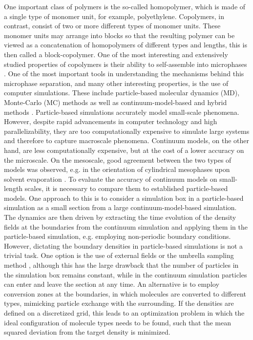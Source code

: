 \documentclass[bachelor,       %
               twoside,        %
               BCOR10mm,       %
                ngerman,english  %
               ]{GAUBM}
\begin{document}
One important class of polymers is the so-called homopolymer, which is made of a single type of monomer unit, for example, polyethylene. Copolymers, in contrast, consist of two or more different types of monomer units. These monomer units may arrange into blocks so that the resulting polymer can be viewed as a concatenation of homopolymers of different types and lengths, this is then called a block-copolymer. One of the most interesting and extensively studied properties of copolymers is their ability to self-assemble into microphases \cite{leibler1980theory}. One of the most important tools in understanding the mechanisms behind this microphase separation, and many other interesting properties, is the use of computer simulations. These include particle-based molecular dynamics (MD), Monte-Carlo (MC) methods as well as continuum-model-based and hybrid methods \cite{Shuanhu2017}. Particle-based simulations accurately model small-scale phenomena. However, despite rapid advancements in computer technology and high parallelizability, they are too computationally expensive to simulate large systems and therefore to capture macroscale phenomena. Continuum models, on the other hand, are less computationally expensive, but at the cost of a lower accuracy on the microscale. On the mesoscale, good agreement between the two types of models was observed, e.g. in the orientation of cylindrical mesophases upon solvent evaporation \cite{Dreyer22}. To evaluate the accuracy of continuum models on small-length scales, it is necessary to compare them to established particle-based models. One approach to this is to consider a simulation box in a particle-based simulation as a small section from a large continuum-model-based simulation. The dynamics are then driven by extracting the time evolution of the density fields at the boundaries from the continuum simulation and applying them in the particle-based simulation, e.g. employing non-periodic boundary conditions. However, dictating the boundary densities in particle-based simulations is not a trivial task. One option is the use of external fields or the umbrella sampling method \cite{glenn74}, although this has the large drawback that the number of particles in the simulation box remains constant, while in the continuum simulation particles can enter and leave the section at any time. An alternative is to employ conversion zones at the boundaries, in which molecules are converted to different types, mimicking particle exchange with the surrounding. If the densities are defined on a discretized grid, this leads to an optimization problem in which the ideal configuration of molecule types needs to be found, such that the mean squared deviation from the target density is minimized. \\
\end{document}
